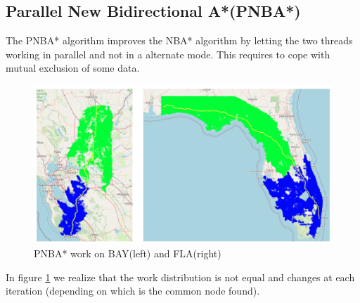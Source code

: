\documentclass[twocolumn, switch]{article} %
\begin{document}
\subsection{Parallel New Bidirectional A*(PNBA*)}
The PNBA* algorithm improves the NBA* algorithm by letting the two threads working in
parallel and not in a alternate mode. This requires to cope with mutual exclusion of some data.
\begin{figure}[ht!]
  \centering
  \includegraphics[width=1\linewidth]{pnba/pnbamap.png}
  \caption{PNBA* work on BAY(left) and FLA(right)}
  \label{pnbamap}
\end{figure}
In figure \ref{pnbamap} we realize that the work distribution is not equal and changes 
at each iteration (depending on which is the common node found).
\end{document}
